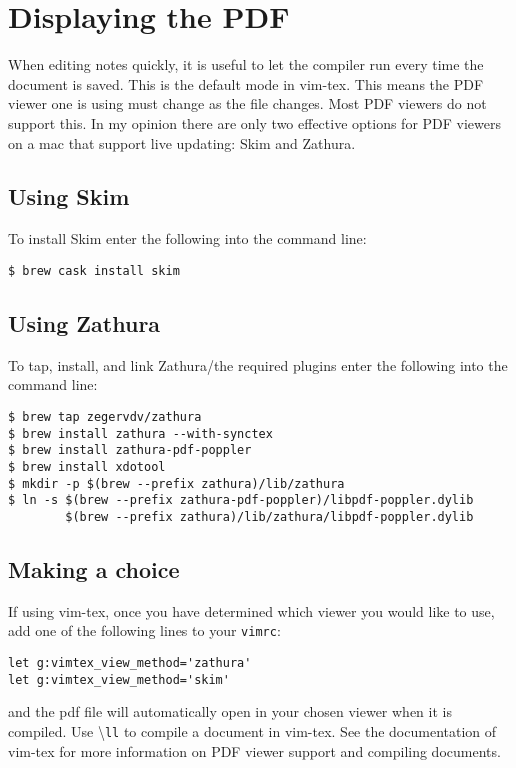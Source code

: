 \documentclass{amsart}
\begin{document}
\section{Displaying the PDF}

When editing notes quickly, it is useful to let the compiler run every time the document
is saved. This is the default mode in vim-tex. This means the PDF viewer one is using must
change as the file changes. Most PDF viewers do not support this. 
In my opinion there are only two effective options for PDF viewers on a mac that support
live updating: Skim and Zathura.

\subsection{Using Skim}

To install Skim enter the following into the command line:
\begin{center}
\begin{verbatim}
$ brew cask install skim
\end{verbatim}
\end{center}

\subsection{Using Zathura}

To tap, install, and link Zathura/the required plugins 
enter the following into the command line:
\begin{center}
\begin{verbatim}
$ brew tap zegervdv/zathura
$ brew install zathura --with-synctex
$ brew install zathura-pdf-poppler
$ brew install xdotool
$ mkdir -p $(brew --prefix zathura)/lib/zathura
$ ln -s $(brew --prefix zathura-pdf-poppler)/libpdf-poppler.dylib 
        $(brew --prefix zathura)/lib/zathura/libpdf-poppler.dylib
\end{verbatim}
\end{center}

\subsection{Making a choice}

If using vim-tex, once you have determined which viewer you would like to use, add one of the following
lines to your \texttt{vimrc}:
\begin{verbatim}
let g:vimtex_view_method='zathura'
let g:vimtex_view_method='skim'
\end{verbatim}
and the pdf file will automatically open in your chosen viewer when it is compiled.
Use \textbackslash\texttt{ll} to compile a document in vim-tex.
See the documentation of vim-tex for more information on PDF viewer support and compiling
documents.
\end{document}
